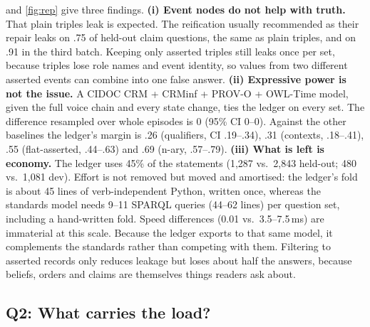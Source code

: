 \documentclass[11pt]{article}
\begin{document}
 and \cref{fig:rep} give three findings. \textbf{(i) Event nodes do not help with truth.} That plain triples leak is expected. The reification usually recommended as their repair leaks on .75 of held-out claim questions, the same as plain triples, and on .91 in the third batch. Keeping only asserted triples still leaks once per set, because triples lose role names and event identity, so values from two different asserted events can combine into one false answer. \textbf{(ii) Expressive power is not the issue.} A CIDOC CRM + CRMinf + PROV-O + OWL-Time model, given the full voice chain and every state change, ties the ledger on every set. The difference resampled over whole episodes is 0 (95\% CI 0--0). Against the other baselines the ledger's margin is .26 (qualifiers, CI .19--.34), .31 (contexts, .18--.41), .55 (flat-asserted, .44--.63) and .69 (n-ary, .57--.79). \textbf{(iii) What is left is economy.} The ledger uses 45\% of the statements (1,287 vs.\ 2,843 held-out; 480 vs.\ 1,081 dev). Effort is not removed but moved and amortised: the ledger's fold is about 45 lines of verb-independent Python, written once, whereas the standards model needs 9--11 SPARQL queries (44--62 lines) per question set, including a hand-written fold. Speed differences (0.01 vs.\ 3.5--7.5\,ms) are immaterial at this scale. Because the ledger exports to that same model, it complements the standards rather than competing with them. Filtering to asserted records only reduces leakage but loses about half the answers, because beliefs, orders and claims are themselves things readers ask about.

\subsection{Q2: What carries the load?}
\label{sec:composer}
\end{document}
